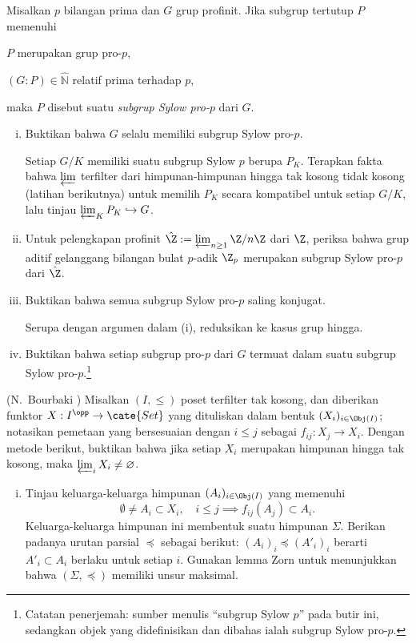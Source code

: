 \begin{Exercises}
	\item Misalkan $p$ bilangan prima dan $G$ grup profinit. Jika subgrup tertutup $P$ memenuhi
	\begin{inparaenum}
		\item $P$ merupakan grup pro-$p$,
		\item $(G:P) \in \hat{\mathbb{N}}$ relatif prima terhadap $p$,
	\end{inparaenum}
	maka $P$ disebut suatu \emph{subgrup Sylow pro-$p$} dari $G$.
	\begin{enumerate}[(i)]
		\item Buktikan bahwa $G$ selalu memiliki subgrup Sylow pro-$p$.
		\begin{hint}
			Setiap $G/K$ memiliki suatu subgrup Sylow $p$ berupa $P_K$. Terapkan fakta bahwa $\varprojlim$ terfilter dari himpunan-himpunan hingga tak kosong tidak kosong (latihan berikutnya) untuk memilih $P_K$ secara kompatibel untuk setiap $G/K$, lalu tinjau $\varprojlim_K P_K \hookrightarrow G$.
		\end{hint}
		\item Untuk pelengkapan profinit $\hat{\Z} := \varprojlim_{n \geq 1} \Z/n\Z$ dari $\Z$, periksa bahwa grup aditif gelanggang bilangan bulat $p$-adik $\Z_p$ merupakan subgrup Sylow pro-$p$ dari $\hat{\Z}$.
		\item Buktikan bahwa semua subgrup Sylow pro-$p$ saling konjugat.
		\begin{hint}
			Serupa dengan argumen dalam (i), reduksikan ke kasus grup hingga.
		\end{hint}
		\item Buktikan bahwa setiap subgrup pro-$p$ dari $G$ termuat dalam suatu subgrup Sylow pro-$p$.\footnote{Catatan penerjemah: sumber menulis ``subgrup Sylow $p$'' pada butir ini, sedangkan objek yang didefinisikan dan dibahas ialah subgrup Sylow pro-$p$.}
	\end{enumerate}
	
	\item (N.\ Bourbaki \cite[III.58 Théorème 1]{BouE}) Misalkan $(I, \leq)$ poset terfilter tak kosong, dan diberikan funktor $X: I^{\opp} \to \cate{Set}$ yang dituliskan dalam bentuk $(X_i)_{i \in \Obj(I)}$; notasikan pemetaan yang bersesuaian dengan $i \leq j$ sebagai $f_{ij}: X_j \to X_i$. Dengan metode berikut, buktikan bahwa jika setiap $X_i$ merupakan himpunan hingga tak kosong, maka $\varprojlim_i X_i \neq \emptyset$.
	\begin{enumerate}[(i)]
		\item Tinjau keluarga-keluarga himpunan $(A_i)_{i \in \Obj(I)}$ yang memenuhi
		\[ \emptyset \neq A_i \subset X_i, \quad i \leq j \implies f_{ij}(A_j) \subset A_i . \]
		Keluarga-keluarga himpunan ini membentuk suatu himpunan $\Sigma$. Berikan padanya urutan parsial $\preceq$ sebagai berikut: $(A_i)_i \preceq (A'_i)_i$ berarti $A'_i \subset A_i$ berlaku untuk setiap $i$. Gunakan lemma Zorn untuk menunjukkan bahwa $(\Sigma, \preceq)$ memiliki unsur maksimal.
		

\end{enumerate}
\end{Exercises}
